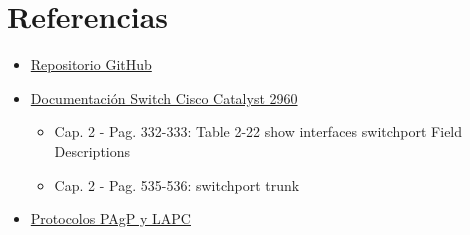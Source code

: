 \documentclass{article}
\begin{document}
    \pagebreak
    \section{Referencias}
        \begin{itemize}
            \item \href{https://github.com/MarianC312/Laboratorio_3_Switches_Administrables}{Repositorio GitHub}
            \item \href{https://www.cisco.com/c/en/us/td/docs/switches/lan/catalyst2960/software/release/12-2_25_see/command/reference/cr.pdf}{Documentación Switch Cisco Catalyst 2960}
            \begin{itemize}
                \item Cap. 2 - Pag. 332-333: Table 2-22 show interfaces switchport Field Descriptions
                \item Cap. 2 - Pag. 535-536: switchport trunk 
            \end{itemize}
            \item \href{https://ccnadesdecero.es/agregacion-de-enlaces-pagp-lacp/}{Protocolos PAgP y LAPC}
        \end{itemize}
\end{document}
